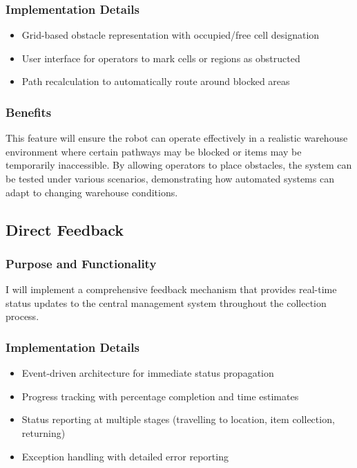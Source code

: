 \subsubsection{Implementation Details}
\begin{itemize}
    \item Grid-based obstacle representation with occupied/free cell designation
    \item User interface for operators to mark cells or regions as obstructed
    \item Path recalculation to automatically route around blocked areas

\end{itemize}

\subsubsection{Benefits}
This feature will ensure the robot can operate effectively in a realistic warehouse environment where certain pathways may be blocked or items may be temporarily inaccessible. By allowing operators to place obstacles, the system can be tested under various scenarios, demonstrating how automated systems can adapt to changing warehouse conditions.

\subsection{Direct Feedback}

\subsubsection{Purpose and Functionality}
I will implement a comprehensive feedback mechanism that provides real-time status updates to the central management system throughout the collection process.

\subsubsection{Implementation Details}
\begin{itemize}
    \item Event-driven architecture for immediate status propagation
    \item Progress tracking with percentage completion and time estimates
    \item Status reporting at multiple stages (travelling to location, item collection, returning)
    \item Exception handling with detailed error reporting
\end{itemize}

